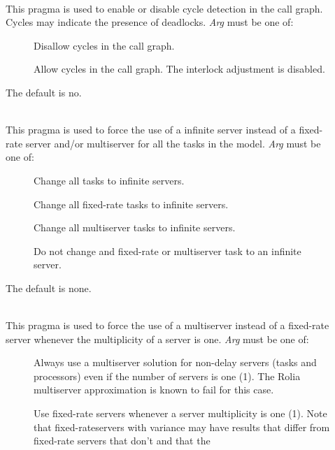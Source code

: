 \begin{description}
\item[]~\\
This pragma is used to enable or disable cycle detection in the call
graph.  Cycles may indicate the presence of deadlocks.
\emph{Arg} must be one of: 
\begin{description}
\item[]
Disallow cycles in the call graph.
\item[]
Allow cycles in the call graph.  The interlock adjustment is disabled.
\end{description}
The default is no.
\item[]~\\
This pragma is used to force the use of a infinite
server instead of a fixed-rate server and/or multiserver for all the tasks in the model.
\emph{Arg} must be one of: 
\begin{description}
\item[]
Change all tasks to infinite servers.
\item[]
Change all fixed-rate tasks to infinite servers.
\item[]
Change all multiserver tasks to infinite servers.
\item[]
Do not change and fixed-rate or multiserver task to an infinite server.
\end{description}
The default is none.
\item[]~\\
This pragma is used to force the use of a multiserver
instead of a fixed-rate server whenever the multiplicity of a server is one.
\emph{Arg} must be one of: 
\begin{description}
\item[]
Always use a multiserver solution for non-delay servers (tasks and processors) even if the number of servers is one (1).
The Rolia multiserver approximation is known to fail for this case.
\item[]
Use fixed-rate servers whenever a server multiplicity is one (1).
Note that fixed-rateservers with variance
may have results that differ from fixed-rate servers that don't and that the

\end{description}
\end{description}
